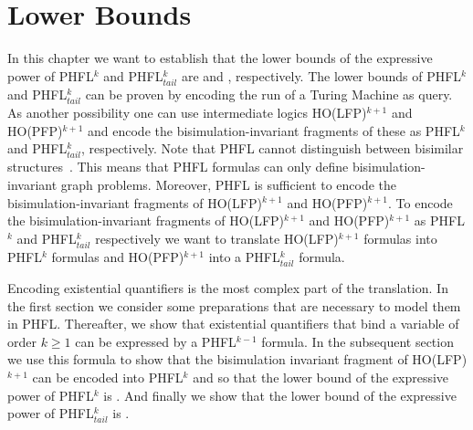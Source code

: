 
\chapter{Lower Bounds}\label{ch:lowerBounds}

In this chapter we want to establish that the lower bounds of the expressive power of PHFL$^k$ and PHFL$^k_{tail}$ are  and , respectively. The
lower bounds of PHFL$^k$ and PHFL$^k_{tail}$ can be proven by encoding the run of a Turing Machine as query.
As another possibility one can use intermediate logics HO(LFP)$^{k+1}$ and HO(PFP)$^{k+1}$ and encode the bisimulation-invariant fragments of these as PHFL$^k$ and
PHFL$^k_{tail}$, respectively. Note that PHFL cannot distinguish between bisimilar structures~\cite{viswanathan2004higher}. This means that PHFL formulas can only define bisimulation-invariant
graph problems. Moreover, PHFL is sufficient to encode the bisimulation-invariant fragments of HO(LFP)$^{k+1}$ and HO(PFP)$^{k+1}$. To encode the bisimulation-invariant fragments of HO(LF\-P)$^{k+1}$ and HO(PFP)$^{k+1}$ as PHFL$^k$ and
PHFL$^{k}_{tail}$ respectively we want to translate HO(LFP)$^{k+1}$ formulas into PHFL$^k$ formulas and 
HO(PFP)$^{k+1}$ into a PHFL$^k_{tail}$ formula. 

Encoding existential quantifiers is the most complex part of the translation. In the 
first section we consider some preparations that are necessary to model them in PHFL. Thereafter,  we show that existential 
quantifiers that bind a variable of order $k \geq 1$ can be expressed by a PHFL$^{k-1}$ formula. In the subsequent section we 
use this formula to show that the bisimulation invariant fragment of HO(LFP)$^{k+1}$ can be encoded into PHFL$^k$ and so 
that the lower bound of the expressive power of PHFL$^k$ is . And finally we show that the lower bound 
of the expressive power of PHFL$^k_{tail}$ is .








